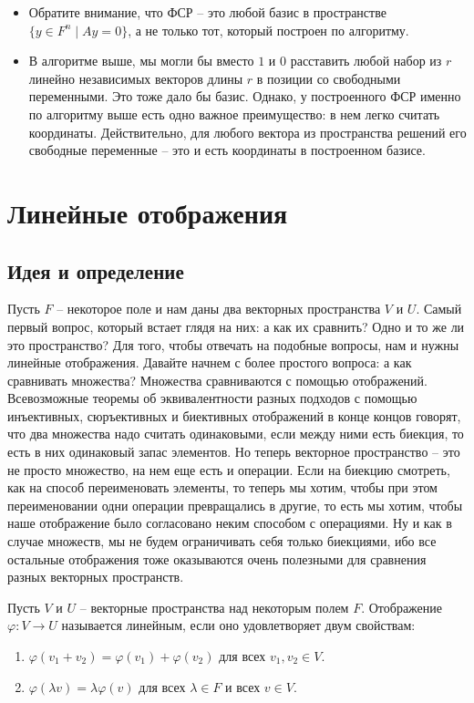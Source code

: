 \begin{itemize}
\item Обратите внимание, что ФСР -- это любой базис в пространстве $\{y\in F^n \mid Ay = 0\}$, а не только тот, который построен по алгоритму.

\item В алгоритме выше, мы могли бы вместо $1$ и $0$ расставить любой набор из $r$ линейно независимых векторов длины $r$ в позиции со свободными переменными.
Это тоже дало бы базис.
Однако, у построенного ФСР именно по алгоритму выше есть одно важное преимущество: в нем легко считать координаты.
Действительно, для любого вектора из пространства решений его свободные переменные -- это и есть координаты в построенном базисе.
\end{itemize}

\newpage
\section{Линейные отображения}

\subsection{Идея и определение}

Пусть $F$ -- некоторое поле и нам даны два векторных пространства $V$ и $U$.
Самый первый вопрос, который встает глядя на них: а как их сравнить?
Одно и то же ли это пространство?
Для того, чтобы отвечать на подобные вопросы, нам и нужны линейные отображения.
Давайте начнем с более простого вопроса: а как сравнивать множества?
Множества сравниваются с помощью отображений.
Всевозможные теоремы об эквивалентности разных подходов с помощью инъективных, сюръективных и биективных отображений в конце концов говорят, что два множества надо считать одинаковыми, если между ними есть биекция, то есть в них одинаковый запас элементов.
Но теперь векторное пространство -- это не просто множество, на нем еще есть и операции.
Если на биекцию смотреть, как на способ переименовать элементы, то теперь мы хотим, чтобы при этом переименовании одни операции превращались в другие, то есть мы хотим, чтобы наше отображение было согласовано неким способом с операциями.
Ну и как в случае множеств, мы не будем ограничивать себя только биекциями, ибо все остальные отображения тоже оказываются очень полезными для сравнения разных векторных пространств.

\begin{definition}
Пусть $V$ и $U$ -- векторные пространства над некоторым полем $F$.
Отображение $\varphi\colon V\to U$ называется линейным, если оно удовлетворяет двум свойствам:
\begin{enumerate}
\item $\varphi(v_1 + v_2) = \varphi(v_1) + \varphi(v_2)$ для всех $v_1,v_2\in V$.

\item $\varphi(\lambda v) = \lambda \varphi(v)$ для всех $\lambda \in F$ и всех $v\in V$.
\end{enumerate}
\end{definition}

